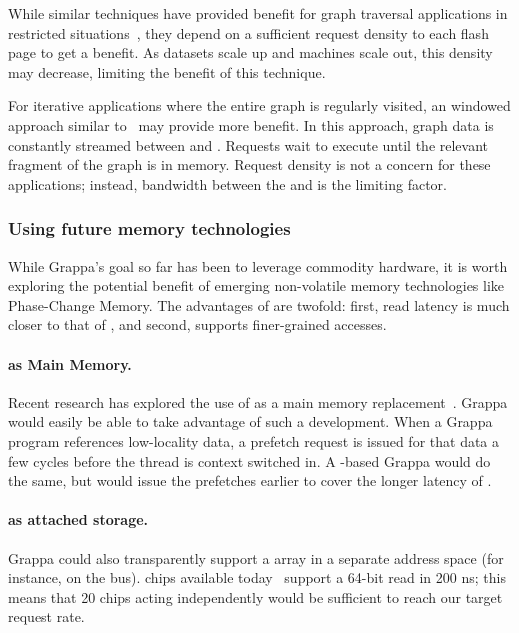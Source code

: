 While similar techniques have provided benefit for graph traversal applications in
restricted situations~\cite{magt:2010}, they depend on a sufficient request
density to each flash page to get a benefit. As datasets scale up and machines scale out, this
density may decrease, limiting the benefit of this technique.

For iterative applications where the entire graph is regularly
visited, an windowed approach similar to~\cite{graphchi:osdi12} may
provide more benefit. In this approach, graph data is constantly
streamed between  and . Requests wait to execute until the
relevant fragment of the graph is in memory. Request density is not a
concern for these applications; instead, bandwidth between the  and 
is the limiting factor.

\subsubsection{Using future memory technologies}

While Grappa's goal so far has been to leverage commodity hardware, it
is worth exploring the potential benefit of emerging non-volatile
memory technologies like Phase-Change Memory. The advantages of 
are twofold: first, read latency is much closer to that of , and
second,  supports finer-grained accesses.

\paragraph{ as Main Memory.}
Recent research has explored the use of  as a main memory
replacement~\cite{pcm:isca09}. Grappa would easily be able to take advantage of such a
development. When a Grappa program references low-locality data,
a prefetch request is issued for that data a few cycles before the
thread is context switched in. A -based
Grappa would do the same, but would issue the prefetches earlier to
cover the longer latency of .

\paragraph{ as attached storage.}
Grappa could also transparently support a  array in a separate address space (for
instance, on the  bus).  chips available today~\cite{micronPCM} support a
64-bit read in 200 ns; this means that 20 chips acting independently
would be sufficient to reach our target request rate.

